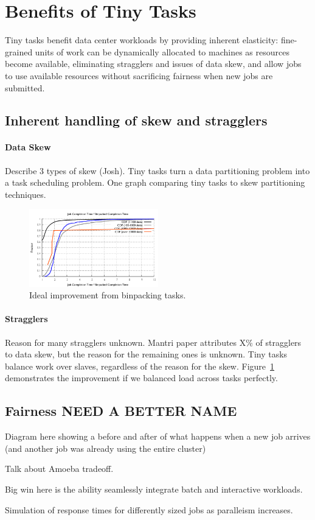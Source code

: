 \section{Benefits of Tiny Tasks}
\label{sec:benefits}
Tiny tasks benefit data center workloads by providing inherent elasticity:
fine-grained units of work can be dynamically allocated to machines as
resources become available, eliminating stragglers and issues of data skew,
and allow jobs to use available resources without sacrificing fairness
when new jobs are submitted.

\subsection{Inherent handling of skew and stragglers}
\paragraph{Data Skew}
Describe 3 types of skew (Josh). Tiny tasks turn a data partitioning problem into
a task scheduling problem. One graph comparing tiny tasks to skew partitioning
techniques.

\begin{figure}[t]
\centering
\hspace{2ex}
\includegraphics[width=0.5\textwidth]{figures/binpacked1-sep}
\vspace{-4ex}
\caption{Ideal improvement from binpacking tasks.}
\vspace{-2ex}
\label{fig:binpacked}
\end{figure}


\paragraph{Stragglers}
Reason for many stragglers unknown. Mantri paper attributes X\% of stragglers
to data skew, but the reason for the remaining ones is unknown. Tiny tasks
balance work over slaves, regardless of the reason for the skew.
Figure~\ref{fig:binpacked} demonstrates the improvement if we
balanced load across tasks perfectly.

\subsection{Fairness NEED A BETTER NAME}
Diagram here showing a before and after of what happens when a new job arrives
(and another job was already using the entire cluster)

Talk about Amoeba tradeoff.

Big win here is the ability seamlessly integrate batch and interactive workloads.

Simulation of response times for differently sized jobs as paralleism increases.

